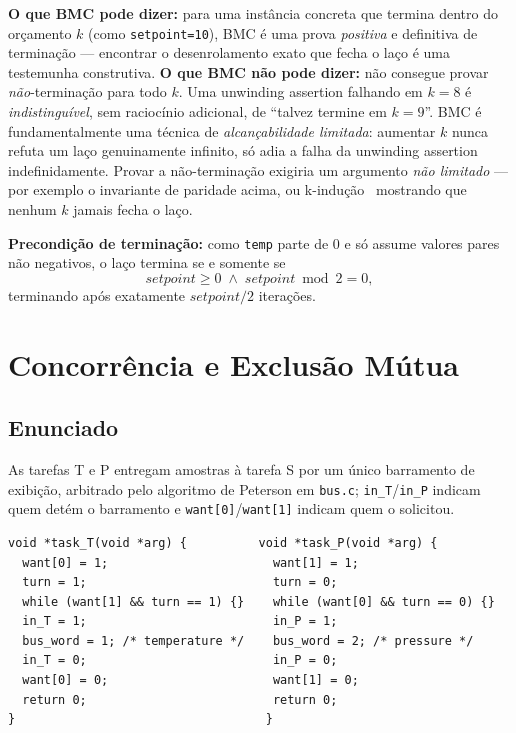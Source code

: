 \documentclass[12pt,a4paper]{article}
\newcommand{\vv}[1]{\texttt{#1}}
\begin{document}
\begin{tcolorbox}[notabox]
\textbf{O que BMC pode dizer:} para uma inst\^ancia concreta que termina dentro do
or\c{c}amento $k$ (como \vv{setpoint=10}), BMC \'e uma prova \emph{positiva} e definitiva
de termina\c{c}\~ao --- encontrar o desenrolamento exato que fecha o la\c{c}o \'e uma
testemunha construtiva.
\textbf{O que BMC n\~ao pode dizer:} n\~ao consegue provar \emph{n\~ao}-termina\c{c}\~ao
para todo $k$. Uma unwinding assertion falhando em $k=8$ \'e \emph{indistingu\'ivel}, sem
racioc\'inio adicional, de ``talvez termine em $k=9$''. BMC \'e fundamentalmente uma
t\'ecnica de \emph{alcan\c{c}abilidade limitada}: aumentar $k$ nunca refuta um la\c{c}o
genuinamente infinito, s\'o adia a falha da unwinding assertion indefinidamente. Provar a
n\~ao-termina\c{c}\~ao exigiria um argumento \emph{n\~ao limitado} --- por exemplo o
invariante de paridade acima, ou k-indu\c{c}\~ao~\cite{gadelha2017} mostrando que nenhum
$k$ jamais fecha o la\c{c}o.
\end{tcolorbox}

\begin{tcolorbox}[resultbox]
\textbf{Precondi\c{c}\~ao de termina\c{c}\~ao:} como \vv{temp} parte de 0 e s\'o assume
valores pares n\~ao negativos, o la\c{c}o termina se e somente se
\[
  setpoint \ge 0 \;\wedge\; setpoint \bmod 2 = 0,
\]
terminando ap\'os exatamente $setpoint/2$ itera\c{c}\~oes.
\end{tcolorbox}

\newpage

\section{Concorr\^encia e Exclus\~ao M\'utua}

\subsection*{Enunciado}
As tarefas T e P entregam amostras \`a tarefa S por um \'unico barramento de exibi\c{c}\~ao,
arbitrado pelo algoritmo de Peterson em \vv{bus.c}; \vv{in\_T}/\vv{in\_P} indicam quem
det\'em o barramento e \vv{want[0]}/\vv{want[1]} indicam quem o solicitou.

\begin{lstlisting}[style=cstyle,caption={exercises/ecps/bus.c}]
void *task_T(void *arg) {          void *task_P(void *arg) {
  want[0] = 1;                       want[1] = 1;
  turn = 1;                          turn = 0;
  while (want[1] && turn == 1) {}    while (want[0] && turn == 0) {}
  in_T = 1;                          in_P = 1;
  bus_word = 1; /* temperature */    bus_word = 2; /* pressure */
  in_T = 0;                          in_P = 0;
  want[0] = 0;                       want[1] = 0;
  return 0;                          return 0;
}                                   }
\end{lstlisting}
\end{document}
